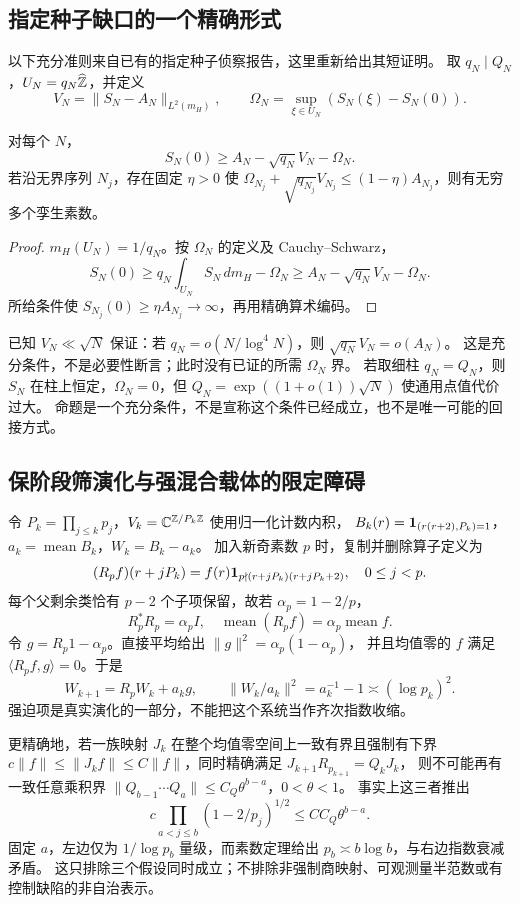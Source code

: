 \subsection{指定种子缺口的一个精确形式}
以下充分准则来自已有的指定种子侦察报告\cite{archiveseed}，这里重新给出其短证明。
取 $q_N\mid Q_N$，$U_N=q_N\widehat{\mathbb Z}$，并定义
\[
V_N=\|S_N-A_N\|_{L^2(m_H)},\qquad
\Omega_N=\sup_{\xi\in U_N}(S_N(\xi)-S_N(0)).
\]
\begin{proposition}[柱集回接的充分条件]\label{prop:seed}
对每个 $N$，
\[
S_N(0)\ge A_N-\sqrt{q_N}V_N-\Omega_N.
\]
若沿无界序列 $N_j$，存在固定 $\eta>0$ 使
$\Omega_{N_j}+\sqrt{q_{N_j}}V_{N_j}\le(1-\eta)A_{N_j}$，则有无穷多个孪生素数。
\end{proposition}
\begin{proof}
$m_H(U_N)=1/q_N$。按 $\Omega_N$ 的定义及 Cauchy--Schwarz，
\[
S_N(0)\ge q_N\int_{U_N}S_N\,dm_H-\Omega_N
\ge A_N-\sqrt{q_N}V_N-\Omega_N.
\]
所给条件使 $S_{N_j}(0)\ge\eta A_{N_j}\to\infty$，再用精确算术编码。
\end{proof}
已知 $V_N\ll\sqrt N$ 保证：若 $q_N=o(N/\log^4N)$，则 $\sqrt{q_N}V_N=o(A_N)$。
这是充分条件，不是必要性断言；此时没有已证的所需 $\Omega_N$ 界。
若取细柱 $q_N=Q_N$，则 $S_N$ 在柱上恒定，$\Omega_N=0$，但
$Q_N=\exp((1+o(1))\sqrt N)$ 使通用点值代价过大。
命题是一个充分条件，不是宣称这个条件已经成立，也不是唯一可能的回接方式。

\subsection{保阶段筛演化与强混合载体的限定障碍}
令 $P_k=\prod_{j\le k}p_j$，$V_k=\mathbb C^{\mathbb Z/P_k\mathbb Z}$ 使用归一化计数内积，
$B_k(r)=\mathbf 1_{(r(r+2),P_k)=1}$，$a_k=\operatorname{mean}B_k$，$W_k=B_k-a_k$。
加入新奇素数 $p$ 时，复制并删除算子定义为
\[
(R_pf)(r+jP_k)=f(r)\mathbf 1_{p\nmid(r+jP_k)(r+jP_k+2)},\quad 0\le j<p.
\]
每个父剩余类恰有 $p-2$ 个子项保留，故若 $\alpha_p=1-2/p$，
\[
R_p^*R_p=\alpha_p I,\quad \operatorname{mean}(R_pf)=\alpha_p\operatorname{mean}f.
\]
令 $g=R_p1-\alpha_p$。直接平均给出 $\|g\|^2=\alpha_p(1-\alpha_p)$，
并且均值零的 $f$ 满足 $\langle R_pf,g\rangle=0$。于是
\[
W_{k+1}=R_pW_k+a_kg,\qquad \|W_k/a_k\|^2=a_k^{-1}-1\asymp(\log p_k)^2.
\]
强迫项是真实演化的一部分，不能把这个系统当作齐次指数收缩。

更精确地，若一族映射 $J_k$ 在整个均值零空间上一致有界且强制有下界
$c\|f\|\le\|J_kf\|\le C\|f\|$，同时精确满足 $J_{k+1}R_{p_{k+1}}=Q_kJ_k$，
则不可能再有一致任意乘积界 $\|Q_{b-1}\cdots Q_a\|\le C_Q\theta^{b-a}$，$0<\theta<1$。
事实上这三者推出
\[
c\prod_{a<j\le b}(1-2/p_j)^{1/2}\le CC_Q\theta^{b-a}.
\]
固定 $a$，左边仅为 $1/\log p_b$ 量级，而素数定理给出 $p_b\asymp b\log b$，与右边指数衰减矛盾。
这只排除三个假设同时成立；不排除非强制商映射、可观测量半范数或有控制缺陷的非自治表示\cite{archiveintertwiner}。

